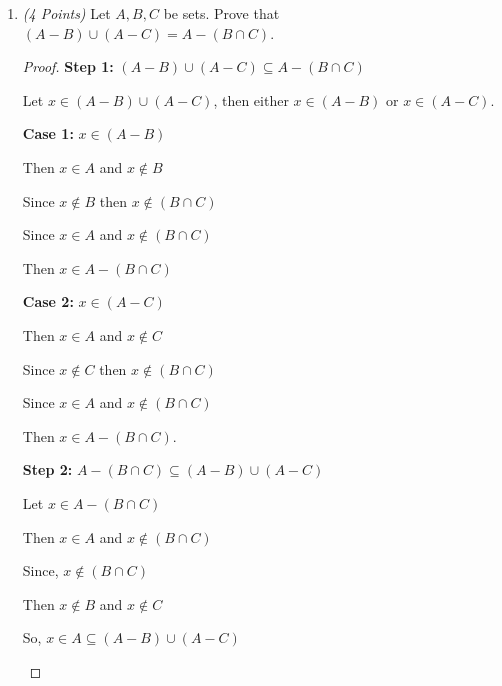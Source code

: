 \documentclass[10pt]{article} %
\newcommand{\points}[1]{{\it (#1 Points)}}
\begin{document}
\begin{enumerate}
\begin{proof}
Following from this: $$\frac{(a^2 + b^2 + 2ab) - 2ab}{ab} \geq 0$$

$$\frac{(a + b)^2}{ab} - \frac{2ab}{ab} \geq 0$$

$$\frac{(a + b)^2}{ab} \geq 2$$

Hence, $\frac{a}{b} + \frac{b}{a} \geq 2$

Therefore, for every two positive real numbers $a$ and $b$ that $\left(a+b\right)\cdot \left(\frac{1}{a}+\frac{1}{b}\right)\ge 4.$
\end{proof}

\bigskip

\item \points{4} Let $A, B, C$ be sets. Prove that $(A-B)\cup (A-C)=A-(B\cap C)$.

\bigskip


\begin{proof} {\bf Step 1:} 
$(A - B) \cup (A - C) \subseteq A - (B \cap C)$

Let $x \in (A - B) \cup (A - C)$, then either $x \in (A - B)$ or $x \in (A - C)$.  
\begin{center} {\bf Case 1:} $x \in (A - B)$

Then $x \in A$ and $x \not\in B$

Since $x \not\in B$ then $x \not\in (B \cap C)$

Since $x \in A$ and $x \not\in (B \cap C)$

Then $x \in A - (B \cap C)$
\end{center}
\begin{center} {\bf Case 2:} $x \in (A - C)$

Then $x \in A$ and $x \not\in C$

Since $x \not\in C$ then $x \not\in (B \cap C)$

Since $x \in A$ and $x \not\in (B \cap C)$

Then $x \in A - (B \cap C)$. 
\end{center}

{\bf Step 2:} 
$A - (B \cap C) \subseteq (A - B) \cup (A - C)$
\begin{center}
Let $x \in A - (B \cap C)$

Then $x \in A$ and $x \not\in (B \cap C)$

Since, $x \not\in (B \cap C)$

Then $x \not\in B$ and $x \not\in C$

So, $x \in A \subseteq (A - B) \cup (A - C)$
\end{center}


\end{proof}
\end{enumerate}
\end{document}
